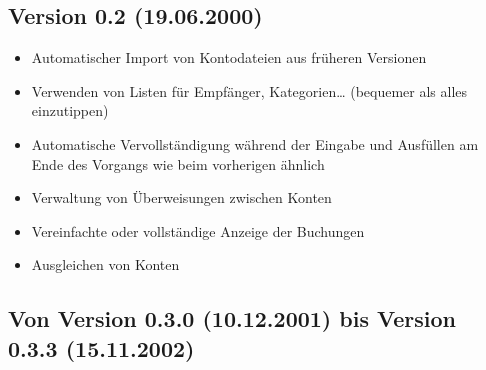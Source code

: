 \subsection{Version 0.2 \textnormal{(19.06.2000)}}

\begin{itemize}
	\item Automatischer Import von Kontodateien aus früheren Versionen%
	\item Verwenden von Listen für Empfänger, Kategorien\dots{} (bequemer als alles einzutippen)%
	\item Automatische Vervollständigung während der Eingabe und Ausfüllen am Ende des Vorgangs wie beim vorherigen ähnlich%
	\item Verwaltung von Überweisungen zwischen Konten%
	\item Vereinfachte oder vollständige Anzeige der Buchungen%
	\item Ausgleichen von Konten%
\end{itemize}

\subsection{Von Version 0.3.0 \textnormal{(10.12.2001)} bis Version 0.3.3 \textnormal{(15.11.2002)}}%

